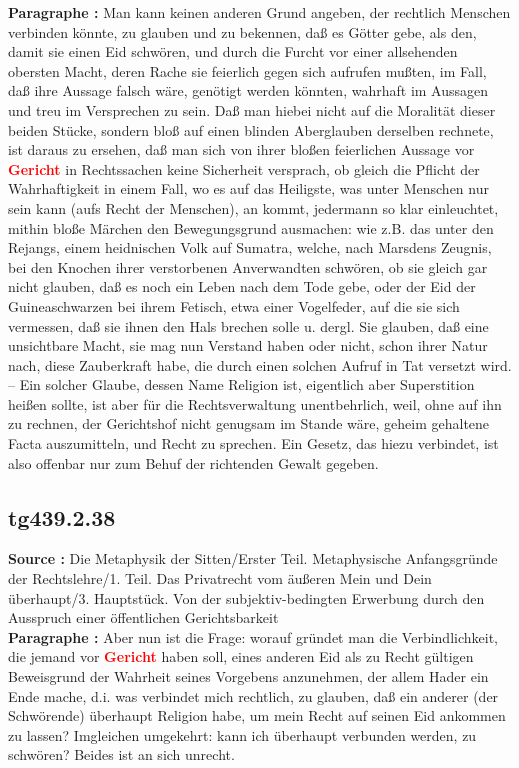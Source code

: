 \documentclass[a4paper,12pt,twoside]{book}
\newcommand{\match}[1]{\textcolor{red}{\textbf{#1}}}
\begin{document}
	\textbf{Paragraphe : }Man kann keinen anderen Grund angeben, der rechtlich Menschen verbinden könnte, zu glauben und zu bekennen, daß es Götter gebe, als den, damit sie einen Eid schwören, und durch die Furcht vor einer allsehenden obersten Macht, deren Rache sie feierlich gegen sich aufrufen mußten, im Fall, daß ihre Aussage falsch wäre, genötigt werden könnten, wahrhaft im Aussagen und treu im Versprechen zu sein. Daß man hiebei nicht auf die Moralität dieser beiden Stücke, sondern bloß auf einen blinden Aberglauben derselben rechnete, ist daraus zu ersehen, daß man sich von ihrer bloßen feierlichen Aussage vor \match{Gericht} in Rechtssachen keine Sicherheit versprach, ob gleich die Pflicht der Wahrhaftigkeit in einem Fall, wo es auf das Heiligste, was unter Menschen nur sein kann (aufs Recht der Menschen), an kommt, jedermann so klar einleuchtet, mithin bloße Märchen den Bewegungsgrund ausmachen: wie z.B. das unter den Rejangs, einem heidnischen Volk auf Sumatra, welche, nach Marsdens Zeugnis, bei den Knochen ihrer verstorbenen Anverwandten schwören, ob sie gleich gar nicht glauben, daß es noch ein Leben nach dem Tode gebe, oder der Eid der Guineaschwarzen bei ihrem Fetisch, etwa einer Vogelfeder, auf die sie sich vermessen, daß sie ihnen den Hals brechen solle u. dergl. Sie glauben, daß eine unsichtbare  Macht, sie mag nun Verstand haben oder nicht, schon ihrer Natur nach, diese Zauberkraft habe, die durch einen solchen Aufruf in Tat versetzt wird. – Ein solcher Glaube, dessen Name Religion ist, eigentlich aber Superstition heißen sollte, ist aber für die Rechtsverwaltung unentbehrlich, weil, ohne auf ihn zu rechnen, der Gerichtshof nicht genugsam im Stande wäre, geheim gehaltene Facta auszumitteln, und Recht zu sprechen. Ein Gesetz, das hiezu verbindet, ist also offenbar nur zum Behuf der richtenden Gewalt gegeben. 
	
	\subsection*{tg439.2.38} 
	\textbf{Source : }Die Metaphysik der Sitten/Erster Teil. Metaphysische Anfangsgründe der Rechtslehre/1. Teil. Das Privatrecht vom äußeren Mein und Dein überhaupt/3. Hauptstück. Von der subjektiv-bedingten Erwerbung durch den Ausspruch einer öffentlichen Gerichtsbarkeit\\  
	
	\textbf{Paragraphe : }Aber nun ist die Frage: worauf gründet man die Verbindlichkeit, die jemand vor \match{Gericht} haben soll, eines anderen Eid als zu Recht gültigen Beweisgrund der Wahrheit seines Vorgebens anzunehmen, der allem Hader ein Ende mache, d.i. was verbindet mich rechtlich, zu glauben, daß ein anderer (der Schwörende) überhaupt Religion habe, um mein Recht auf seinen Eid ankommen zu lassen? Imgleichen umgekehrt: kann ich überhaupt verbunden werden, zu schwören? Beides ist an sich unrecht. 
	
\end{document}
